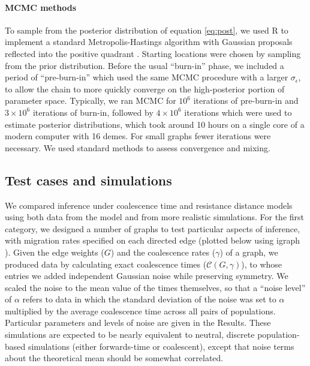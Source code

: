 \documentclass{article}
\begin{document}
\paragraph{MCMC methods}
To sample from the posterior distribution of equation \eqref{eq:post}, 
we used R \citep{Rmanual} 
to implement a standard Metropolis-Hastings algorithm with Gaussian proposals 
reflected into the positive quadrant \citep{brooks2011handbook}. 
Starting locations were chosen by sampling from the prior distribution.
Before the usual ``burn-in'' phase,
we included a period of ``pre-burn-in'' which used the same MCMC procedure
with a larger $\sigma_\epsilon$, to allow the chain to more quickly converge on the high-posterior
portion of parameter space.
Typically, we ran MCMC for $10^6$ iterations of pre-burn-in 
and $3 \times 10^6$ iterations of burn-in,
followed by $4 \times 10^6$ iterations which were used to estimate posterior distributions,
which took around 10 hours on a single core of a modern computer with 16 demes. 
For small graphs fewer iterations were necessary.
We used standard methods to assess convergence and mixing. 


\subsection*{Test cases and simulations}

We compared inference under coalescence time and resistance distance models
using both data from the model and from more realistic simulations. 
For the first category, we designed a number of graphs to test particular aspects of inference,
with migration rates specified on each directed edge
(plotted below using igraph \citep{igraph}).
Given the edge weights ($G$) and the coalescence rates ($\gamma$) of a graph,
we produced data by calculating exact coalescence times ($\mathcal{C}(G,\gamma)$),
to whose entries we added independent Gaussian noise while preserving symmetry.
We scaled the noise to the mean value of the times themselves,
so that a ``noise level'' of $\alpha$ refers to data in which the standard deviation of the noise
was set to $\alpha$ multiplied by the average coalescence time across all pairs of populations.
Particular parameters and levels of noise are given in the Results.
These simulations are expected to be nearly equivalent to neutral, discrete population-based simulations
(either forwards-time or coalescent),
except that noise terms about the theoretical mean should be somewhat correlated.
\end{document}
